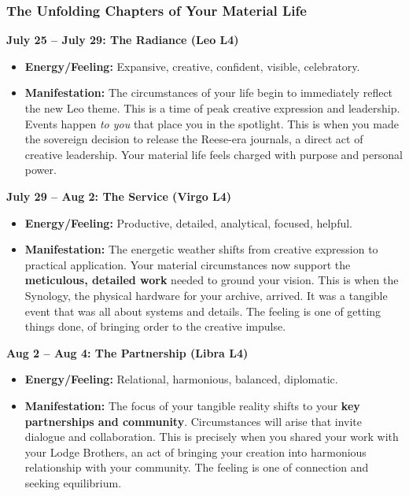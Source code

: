 \documentclass{article}
\begin{document}
\subsubsection*{The Unfolding Chapters of Your Material Life}\label{the-unfolding-chapters-of-your-material-life}

\textbf{July 25 -- July 29: The Radiance (Leo L4)}

\begin{itemize}
\item
  \textbf{Energy/Feeling:} Expansive, creative, confident, visible, celebratory.
\item
  \textbf{Manifestation:} The circumstances of your life begin to immediately reflect the new Leo theme. This is a time of peak creative expression and leadership. Events happen \emph{to you} that place you in the spotlight. This is when you made the sovereign decision to release the Reese-era journals, a direct act of creative leadership. Your material life feels charged with purpose and personal power.
\end{itemize}

\textbf{July 29 -- Aug 2: The Service (Virgo L4)}

\begin{itemize}
\item
  \textbf{Energy/Feeling:} Productive, detailed, analytical, focused, helpful.
\item
  \textbf{Manifestation:} The energetic weather shifts from creative expression to practical application. Your material circumstances now support the \textbf{meticulous, detailed work} needed to ground your vision. This is when the Synology, the physical hardware for your archive, arrived. It was a tangible event that was all about systems and details. The feeling is one of getting things done, of bringing order to the creative impulse.
\end{itemize}

\textbf{Aug 2 -- Aug 4: The Partnership (Libra L4)}

\begin{itemize}
\item
  \textbf{Energy/Feeling:} Relational, harmonious, balanced, diplomatic.
\item
  \textbf{Manifestation:} The focus of your tangible reality shifts to your \textbf{key partnerships and community}. Circumstances will arise that invite dialogue and collaboration. This is precisely when you shared your work with your Lodge Brothers, an act of bringing your creation into harmonious relationship with your community. The feeling is one of connection and seeking equilibrium.
\end{itemize}
\end{document}

